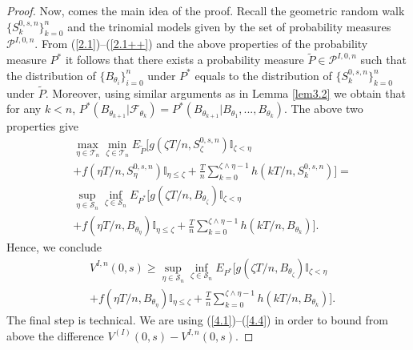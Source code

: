 \documentclass{amsart}
\numberwithin{equation}{section}
\begin{document}
\begin{proof}
Now, comes the main idea of the proof. Recall the geometric random walk
$\{S^{0,s,n}_k\}_{k=0}^n$ and the
trinomial models given by the set of probability measures
$\mathcal P^{I,0,n}$. From (\ref{2.1})--(\ref{2.1++}) and the above properties of the probability measure $P^*$
 it follows that there exists a probability measure $\tilde P\in \mathcal P^{I,0,n}$ such that
 the distribution
 of $\{B_{\theta_i}\}_{i=0}^n$ under $P^{*}$ equals to the distribution
 of $\{S^{0,s,n}_k\}_{k=0}^n$ under $\tilde P$.
Moreover, using similar arguments as in Lemma \ref{lem3.2} we obtain
that for any $k<n$,
$P^{*}(B_{\theta_{k+1}}|\mathcal F_{\theta_k})=P^{*}(B_{\theta_{k+1}}|B_{\theta_1},...,B_{\theta_k}).$
The above two properties give
\begin{eqnarray*}
&\max_{\eta\in\mathcal T_n}
\min_{\zeta\in\mathcal T_n} E_{\tilde P}[g(\zeta T/n,S^{0,s,n}_{\zeta})\mathbb{I}_{\zeta<\eta}\nonumber\\
&+f(\eta T/n,S^{0,s,n}_{\eta})\mathbb{I}_{\eta\leq\zeta}+\frac{T}{n}\sum_{k=0}^{\zeta\wedge\eta-1} h(kT/n,S^{0,s,n}_{k})]=\\
&\sup_{\eta\in\mathcal S_n}\inf_{\zeta\in\mathcal S_n}E_{P^{*}}[g(\zeta T/n,B_{\theta_{\zeta}})\mathbb{I}_{\zeta<\eta}\\
&+f(\eta T/n,B_{\theta_{\eta}})\mathbb{I}_{\eta\leq\zeta}+\frac{T}{n}\sum_{k=0}^{\zeta\wedge\eta-1} h(k T/n,B_{\theta_k})].
\end{eqnarray*}
Hence, we conclude
\begin{eqnarray}\label{4.4}
&V^{I,n}(0,s)\geq\sup_{\eta\in\mathcal S_n}
\inf_{\zeta\in\mathcal S_n}E_{P^{*}}[g(\zeta T/n,B_{\theta_{\zeta}})\mathbb{I}_{\zeta<\eta}\\
&+f(\eta T/n,B_{\theta_{\eta}})\mathbb{I}_{\eta\leq\zeta}+\frac{T}{n}\sum_{k=0}^{\zeta\wedge\eta-1} h(k T/n,B_{\theta_k})].\nonumber
\end{eqnarray}
The final step is technical. We are using (\ref{4.1})--(\ref{4.4}) in order to
bound from above the difference $V^{(I)}(0,s)-V^{I,n}(0,s)$.


\end{proof}
\end{document}
